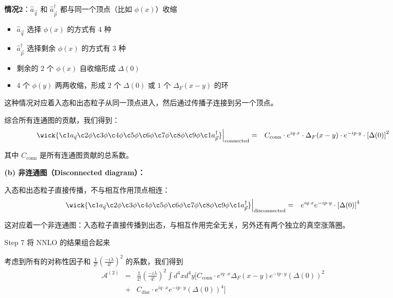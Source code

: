 \begin{example}
\begin{solution}
\begin{enumerate}
\begin{itemize}
                \textbf{情况2}：$\hat{a}_{\vec{q}}$ 和 $\hat{a}_{\vec{p}}^\dagger$ 都与同一个顶点（比如 $\phi(x)$）收缩
                \begin{itemize}
                    \item $\hat{a}_{\vec{q}}$ 选择 $\phi(x)$ 的方式有 $4$ 种
                    \item $\hat{a}_{\vec{p}}^\dagger$ 选择剩余 $\phi(x)$ 的方式有 $3$ 种
                    \item 剩余的 $2$ 个 $\phi(x)$ 自收缩形成 $\Delta(0)$
                    \item $4$ 个 $\phi(y)$ 两两收缩，形成 $2$ 个 $\Delta(0)$ 或 $1$ 个 $\Delta_F(x-y)$ 的环
                \end{itemize}

                这种情况对应着入态和出态粒子从同一顶点进入，然后通过传播子连接到另一个顶点。

                综合所有连通图的贡献，我们得到：
                \begin{eqnarray*}
                    \wick{\c1 a_{\vec{q}} \c2 \phi \c3 \phi \c4 \phi \c5 \phi \c6 \phi \c7 \phi \c8 \phi \c9 \phi \c1 a_{\vec{p}}^\dagger} \Big|_{\text{connected}} &=& C_{\text{conn}} \cdot e^{iq\cdot x} \cdot \Delta_F(x-y) \cdot e^{-ip\cdot y} \cdot \left[\Delta(0)\right]^2
                \end{eqnarray*}

                其中 $C_{\text{conn}}$ 是所有连通图贡献的总系数。

                \textbf{(b) 非连通图（Disconnected diagram）：}

                入态和出态粒子直接传播，不与相互作用顶点相连：
                \begin{eqnarray*}
                    \wick{\c1 a_{\vec{q}} \c2 \phi \c3 \phi \c4 \phi \c5 \phi \c6 \phi \c7 \phi \c8 \phi \c9 \phi \c1 a_{\vec{p}}^\dagger} \Big|_{\text{disconnected}} &=& e^{iq\cdot x} e^{-ip\cdot y} \cdot \left[\Delta(0)\right]^4
                \end{eqnarray*}

                这对应着一个非连通图：入态粒子直接传播到出态，与相互作用完全无关，另外还有两个独立的真空涨落圈。

                \item[Step 7] 将 NNLO 的结果组合起来

                考虑到所有的对称性因子和 $\frac{1}{2!}\left(\frac{-i\lambda}{4!}\right)^2$ 的系数，我们得到
                \begin{eqnarray*}
                    \mathcal{A}^{(2)} &=& \frac{1}{2!}\left(\frac{-i\lambda}{4!}\right)^2 \int d^4x d^4y \Big[ C_{\text{conn}} \cdot e^{iq\cdot x} \Delta_F(x-y) e^{-ip\cdot y} \left(\Delta(0)\right)^2 \\
                    &+& C_{\text{disc}} \cdot e^{iq\cdot x} e^{-ip\cdot y} \left(\Delta(0)\right)^4 \Big]
                \end{eqnarray*}


\end{itemize}
\end{enumerate}
\end{solution}
\end{example}
